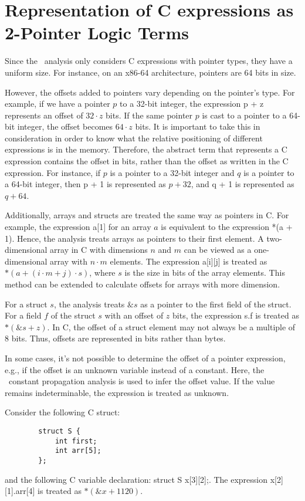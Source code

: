 \section{Representation of C expressions as 2-Pointer Logic Terms}

Since the \cpo\ analysis only considers C expressions with pointer types, they have a uniform size.
For instance, on an x86-64 architecture, pointers are 64 bits in size.

However, the offsets added to pointers vary depending on the pointer's type.
For example, if we have a pointer $p$ to a 32-bit integer,
the expression \textsf{p + z} represents an offset of $32 \cdot z$ bits.
If the same pointer $p$ is cast to a pointer to a 64-bit integer, the offset becomes $64 \cdot z$ bits.
It is important to take this in consideration in order to know what the relative positioning of
different expressions is in the memory.
Therefore, the abstract term that represents a C expression contains the offset in bits, rather than the offset as written in the C expression.
For instance, if $p$ is a pointer to a 32-bit integer and $q$ is a pointer to a 64-bit integer, then \textsf{p + 1} is represented as $p + 32$, and \textsf{q + 1} is represented as $q + 64$.

Additionally, arrays and structs are treated the same way as pointers in C.
For example, the expression \textsf{a[1]} for an array $a$ is equivalent to the expression \textsf{*(a + 1)}.
Hence, the analysis treats arrays as pointers to their first element.
A two-dimensional array in C with dimensions $n$ and $m$ can be viewed as a one-dimensional array with $n \cdot m$ elements.
The expression \textsf{a[i][j]} is treated as $*(a + (i \cdot m + j) \cdot s)$, where $s$ is the size in bits of the array elements.
This method can be extended to calculate offsets for arrays with more dimension.

For a struct $s$, the analysis treats $\&s$ as a pointer to the first field of the struct.
For a field $f$ of the struct $s$ with an offset of $z$ bits,
the expression \textsf{s.f} is treated as $*(\&s + z)$.
In C, the offset of a struct element may not always be a multiple of 8 bits.
Thus, offsets are represented in bits rather than bytes.

In some cases, it's not possible to determine the offset of a pointer expression,
e.g., if the offset is an unknown variable instead of a constant.
Here, the \goblint\ constant propagation analysis is used to infer the offset value.
If the value remains indeterminable, the expression is treated as unknown.

\begin{example}
    Consider the following C struct:
    \begin{verbatim}
        struct S {
            int first;
            int arr[5];
        };
    \end{verbatim}
    and the following C variable declaration: \textsf{struct S x[3][2];}.
    The expression \textsf{x[2][1].arr[4]} is treated as $*(\&x + 1120)$.
\end{example}
